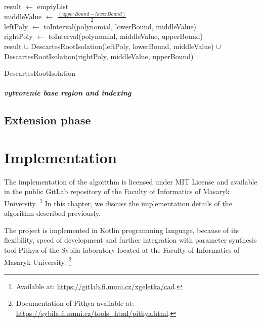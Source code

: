 \documentclass[
  digital, %
  twoside, %
  table,   %
  nolof,     %
  nolot,     %
]{fithesis3}
\begin{document}
\begin{algorithm}[H]
    
 result $\gets$ emptyList\\
 middleValue $\gets$ $\frac{(upperBound - lowerBound)}{2}$\\
 leftPoly $\gets$ toInterval(polynomial, lowerBound, middleValue)\\
 rightPoly $\gets$ toInterval(polynomial, middleValue, upperBound)\\
 \Return result $\cup$
 \newline
 DescartesRootIsolation(leftPoly, lowerBound, middleValue) $\cup$
 \newline
 DescartesRootIsolation(rightPoly, middleValue, upperBound)
 \caption{DescartesRootIsolation}
\end{algorithm}

\paragraph{
vytvorenie base region and indexing
}
\section{Extension phase}

\chapter{Implementation}
The implementation of the algorithm is licensed under MIT License and available in the public GitLab repository of the Faculty of Informatics of Masaryk University. \footnote{
  Available at: \url{https://gitlab.fi.muni.cz/xgeletka/cad}.
} In this chapter, we discuss the implementation details of
the algorithm described previously.

The project is implemented in Kotlin programming language, because of its flexibility, speed of development and further integration with parameter synthesis tool Pithya of the Sybila laboratory located at the Faculty of Informatics of Masaryk University. \footnote{
  Documentation of Pithya available at: \url{https://sybila.fi.muni.cz/tools_html/pithya.html}.
}
\end{document}
